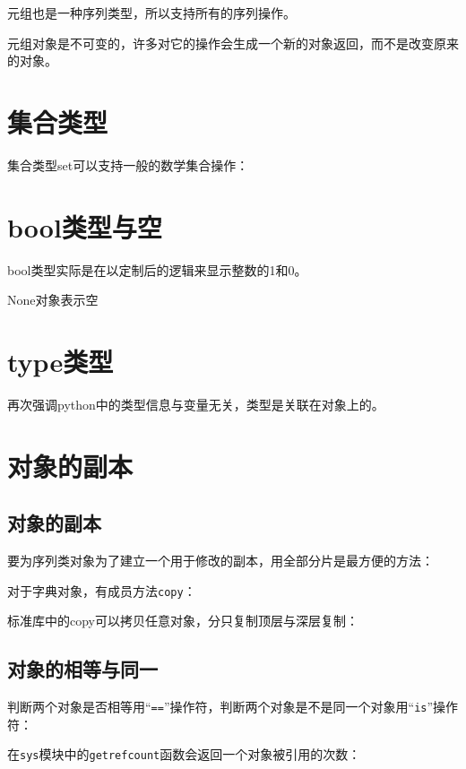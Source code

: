 		元组也是一种序列类型，所以支持所有的序列操作。

		元组对象是不可变的，许多对它的操作会生成一个新的对象返回，而不是改变原来的对象。

%		
		
	\section{集合类型}

		集合类型set可以支持一般的数学集合操作：

		
		
	\section{bool类型与空}

		bool类型实际是在以定制后的逻辑来显示整数的1和0。

		None对象表示空
		
		

	\section{type类型}

		再次强调python中的类型信息与变量无关，类型是关联在对象上的。

		

	\section{对象的副本}
		\subsection{对象的副本}

			要为序列类对象为了建立一个用于修改的副本，用全部分片是最方便的方法：

			

			对于字典对象，有成员方法\verb|copy|：

			

			标准库中的copy可以拷贝任意对象，分只复制顶层与深层复制：

			

		\subsection{对象的相等与同一}

			判断两个对象是否相等用“\verb|==|”操作符，判断两个对象是不是同一个对象用“\verb|is|”操作符：

			

			在\verb|sys|模块中的\verb|getrefcount|函数会返回一个对象被引用的次数：

			

